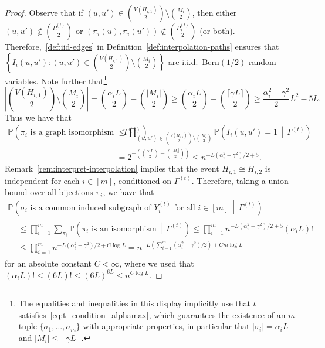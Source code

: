\documentclass[11pt]{article}
\theoremstyle{plain}
\theoremstyle{definition}
\theoremstyle{remark}
\renewcommand{\Pr}{\mathbb{P}}
\begin{document}
\begin{proof}
    Observe that if 
    $(u,u') \in \binom{V(H_{i,1})}{2} \setminus \binom{M_{i}}{2}$, 
    then either $(u,u') \notin \binom{P_{1}^{(t)}}{2}$ 
    or $(\pi_{i}(u), \pi_{i}(u')) \notin \binom{P_{2}^{(t)}}{2}$ 
    (or both). 
    Therefore,~\eqref{def:iid-edges} in Definition~\ref{def:interpolation-paths} ensures that 
    $\left\{ I_{i}(u,u') : (u,u') \in \binom{V(H_{i,1})}{2} \setminus \binom{M_{i}}{2} \right\}$ 
    are i.i.d.\ $\mathrm{Bern}(1/2)$ random variables. 
    Note further that\footnote{The equalities and inequalities in this display implicitly use that $t$ satisfies~\eqref{eq:t_condition_alphamax}, which guarantees the existence of an $m$-tuple $\{\sigma_{1}, \ldots, \sigma_{m}\}$ with appropriate properties, in particular that $|\sigma_{i}| = \alpha_{i} L$ and $|M_{i}| \leq \left\lceil \gamma L \right\rceil$.}  
    \[
    \left| \binom{V(H_{i,1})}{2} \setminus \binom{M_{i}}{2} \right| 
    = \binom{\alpha_i L}{2} - \binom{|M_i|}{2}
    \geq \binom{\alpha_i L}{2} - \binom{\lceil \gamma L \rceil}{2}
    \geq \frac{\alpha_{i}^{2} - \gamma^{2}}{2} L^{2} - 5 L.
    \]
    Thus we have that 
    \begin{align*}
        \Pr\left(\pi_i \text{ is a graph isomorphism} \, \middle| \, \Gamma^{(t)}\right) 
        &\leq \prod_{(u, u') \in \binom{V(H_{i,1})}{2} \setminus \binom{M_{i}}{2}} \Pr\left(I_{i}(u,u') = 1 \, \middle| \, \Gamma^{(t)}\right) \\
        &= 2^{-\left( \binom{\alpha_i L}{2} - \binom{|M_i|}{2}\right)} 
        \leq n^{-L(\alpha_i^2 - \gamma^2)/2 + 5}.
    \end{align*}
    Remark~\ref{rem:interpret-interpolation} implies that the event $H_{i,1} \cong H_{i,2}$ is independent for each $i \in [m]$, conditioned on $\Gamma^{(t)}$. Therefore, taking a union bound over all bijections $\pi_i$, we have that
    \begin{multline*}
        \Pr\left(\sigma_i \text{ is a common induced subgraph of } Y_{i}^{(t)} \text{ for all } i \in [m] \, \middle| \, \Gamma^{(t)}\right) \\
        \begin{aligned}
        &\leq \prod_{i=1}^m \sum_{\pi_i} \Pr\left(\pi_i \text{ is an isomorphism} \, \middle| \, \Gamma^{(t)}\right) 
        \leq \prod_{i=1}^m n^{-L(\alpha_i^2 - \gamma^2)/2 + 5} (\alpha_i L)! \\
        &\leq \prod_{i=1}^m n^{-L(\alpha_i^2 - \gamma^2)/2 + C \log L} 
        = n^{-L \left(\sum_{i=1}^m(\alpha_i^2 - \gamma^2)/2\right) + C m \log L}
        \end{aligned}
    \end{multline*}
for an absolute constant $C < \infty$, 
where we used that 
$(\alpha_{i} L)! \leq (6L)! \leq (6L)^{6L} \leq n^{C \log L}$.
\end{proof}
\end{document}
